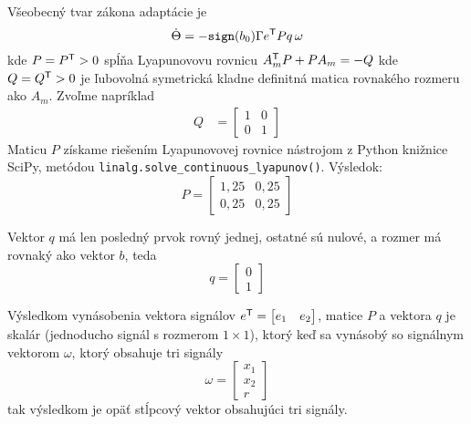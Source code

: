 \documentclass[a4paper, 10pt, ]{article}
\begin{document}
Všeobecný tvar zákona adaptácie je
\begin{equation}
	\dot \Theta = - \texttt{sign}(b_0) \Gamma e^{\mathsf{T}} P q \, \omega
\end{equation}
kde $P = P^{\mathsf{T}} > 0$ spĺňa Lyapunovovu rovnicu $ A_m^{\mathsf{T}} P + P A_m = - Q$ kde $Q = Q^{\mathsf{T}} > 0$ je ľubovolná symetrická kladne definitná matica rovnakého rozmeru ako $A_m$. Zvoľme napríklad
\begin{align*}
	 Q &= \begin{bmatrix} 1 & 0\\ 0& 1 \end{bmatrix}
\end{align*}
Maticu $P$ získame riešením Lyapunovovej rovnice nástrojom z Python knižnice SciPy, metódou \lstinline{linalg.solve_continuous_lyapunov()}. Výsledok:
\begin{equation}
	P = \begin{bmatrix} 1,25 &  0,25 \\   0,25  &  0,25 \end{bmatrix}
\end{equation}

Vektor $q$ má len posledný prvok rovný jednej, ostatné sú nulové, a rozmer má rovnaký ako vektor $b$, teda
\begin{equation}
	q = \begin{bmatrix} 0 \\ 1 \end{bmatrix}
\end{equation}

Výsledkom vynásobenia vektora signálov $e^{\mathsf{T}} = \begin{bmatrix} e_1 & e_2 \end{bmatrix}$, matice $P$ a vektora $q$ je skalár (jednoducho signál s rozmerom $1 \times 1$), ktorý keď sa vynásobý so  signálnym vektorom $\omega$, ktorý obsahuje tri signály
\begin{equation}
	\omega = \begin{bmatrix} x_1 \\ x_2 \\ r \end{bmatrix}
\end{equation}
tak výsledkom je opäť stĺpcový vektor obsahujúci tri signály.
\end{document}
